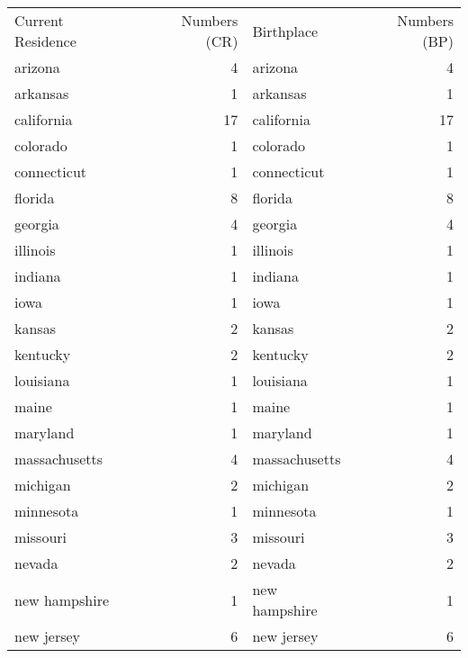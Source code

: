 \begin{table}[]
\begin{tabular}{lrlr}
Current Residence & Numbers (CR) & Birthplace     & Numbers (BP) \\
arizona           & 4            & arizona        & 4            \\
arkansas          & 1            & arkansas       & 1            \\
california        & 17           & california     & 17           \\
colorado          & 1            & colorado       & 1            \\
connecticut       & 1            & connecticut    & 1            \\
florida           & 8            & florida        & 8            \\
georgia           & 4            & georgia        & 4            \\
illinois          & 1            & illinois       & 1            \\
indiana           & 1            & indiana        & 1            \\
iowa              & 1            & iowa           & 1            \\
kansas            & 2            & kansas         & 2            \\
kentucky          & 2            & kentucky       & 2            \\
louisiana         & 1            & louisiana      & 1            \\
maine             & 1            & maine          & 1            \\
maryland          & 1            & maryland       & 1            \\
massachusetts     & 4            & massachusetts  & 4            \\
michigan          & 2            & michigan       & 2            \\
minnesota         & 1            & minnesota      & 1            \\
missouri          & 3            & missouri       & 3            \\
nevada            & 2            & nevada         & 2            \\
new hampshire     & 1            & new hampshire  & 1            \\
new jersey        & 6            & new jersey     & 6            \\

\end{tabular}
\end{table}
